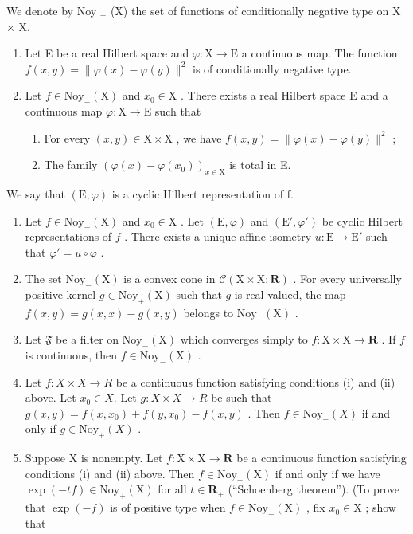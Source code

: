 We denote by Noy \(_{-}\) (X) the set of functions of conditionally negative type on X × X.

\begin{enumerate}
\def\labelenumi{\alph{enumi})}
\item
  Let E be a real Hilbert space and \(\varphi\colon\mathrm{X}\to\mathrm{E}\) a continuous map. The function \(f(x,y)=\|\varphi(x)-\varphi(y)\|^{2}\) is of conditionally negative type.
\item
  Let \(f\in\mathrm{Noy}_{-}(\mathrm{X})\) and \(x_{0}\in\mathrm{X}\) . There exists a real Hilbert space E and a continuous map \(\varphi\colon\mathrm{X}\to\mathrm{E}\) such that
  \begin{enumerate}
  \def\labelenumii{\alph{enumii})}
  \tightlist
  \item
    For every \((x,y)\in \mathrm{X}\times \mathrm{X}\) , we have \(f(x,y) = \| \varphi (x) - \varphi (y)\| ^2\) ;
  \item
    The family \((\varphi(x)-\varphi(x_{0}))_{x\in\mathrm{X}}\) is total in E.
  \end{enumerate}
\end{enumerate}

We say that \((\mathrm{E},\varphi)\) is a cyclic Hilbert representation of f.

\begin{enumerate}
\def\labelenumi{\alph{enumi})}
\setcounter{enumi}{2}
\item
  Let \(f \in \mathrm{Noy}_{-}(\mathrm{X})\) and \(x_0 \in \mathrm{X}\) . Let \((\mathrm{E}, \varphi)\) and \((\mathrm{E}', \varphi')\) be cyclic Hilbert representations of \(f\) . There exists a unique affine isometry \(u: \mathrm{E} \to \mathrm{E}'\) such that \(\varphi' = u \circ \varphi\) .
\item
  The set \(\mathrm{Noy}_{-}(\mathrm{X})\) is a convex cone in \(\mathcal{C}(\mathrm{X}\times \mathrm{X};\mathbf{R})\) . For every universally positive kernel \(g\in \mathrm{Noy}_{+}(\mathrm{X})\) such that \(g\) is real-valued, the map \(f(x,y) = g(x,x) - g(x,y)\) belongs to \(\mathrm{Noy}_{-}(\mathrm{X})\) .
\item
  Let \(\mathfrak{F}\) be a filter on \(\mathrm{Noy}_{-}(\mathrm{X})\) which converges simply to \(f\colon \mathrm{X}\times \mathrm{X}\to \mathbf{R}\) . If \(f\) is continuous, then \(f\in \mathrm{Noy}_{-}(\mathrm{X})\) .
\item
  Let \(f: X \times X \to R\) be a continuous function satisfying conditions (i) and (ii) above. Let \(x_{0} \in X\). Let \(g: X \times X \to R\) be such that \(g(x, y) = f(x, x_{0}) + f(y, x_{0}) - f(x, y)\) . Then \(f \in \text{Noy}_{-}(X)\) if and only if \(g \in \text{Noy}_{+}(X)\) .
\item
  Suppose X is nonempty. Let \(f: \mathrm{X} \times \mathrm{X} \to \mathbf{R}\) be a continuous function satisfying conditions (i) and (ii) above. Then \(f \in \mathrm{Noy}_{-}(\mathrm{X})\) if and only if we have \(\exp(-tf) \in \mathrm{Noy}_{+}(\mathrm{X})\) for all \(t \in \mathbf{R}_{+}\) (“Schoenberg theorem”). (To prove that \(\exp(-f)\) is of positive type when \(f \in \mathrm{Noy}_{-}(\mathrm{X})\) , fix \(x_0 \in \mathrm{X}\) ; show that
\end{enumerate}

